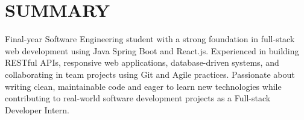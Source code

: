 \section{SUMMARY}
\noindent Final-year Software Engineering student with a strong foundation in full-stack web development using Java Spring Boot and React.js. Experienced in building RESTful APIs, responsive web applications, database-driven systems, and collaborating in team projects using Git and Agile practices. Passionate about writing clean, maintainable code and eager to learn new technologies while contributing to real-world software development projects as a Full-stack Developer Intern.
